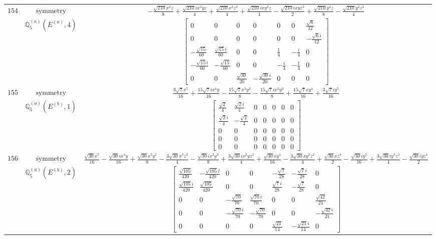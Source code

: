 \documentclass[fleqn,8pt,landscape]{jsarticle}
\begin{document}
\begin{longtable}{ccc}
$ 154 $ & $ \text{symmetry} $ & $ - \frac{\sqrt{210} x^{4} z}{8} + \frac{\sqrt{210} i x^{3} y z}{4} + \frac{\sqrt{210} x^{2} z^{3}}{4} + \frac{\sqrt{210} i x y^{3} z}{4} - \frac{\sqrt{210} i x y z^{3}}{2} + \frac{\sqrt{210} y^{4} z}{8} - \frac{\sqrt{210} y^{2} z^{3}}{4} $ \\
$  $ & $ \mathbb{Q}_{5}^{(a)}(E^{(a)},4) $ & $ \begin{bmatrix} 0 & 0 & 0 & 0 & 0 & 0 & \frac{\sqrt{6}}{12} \\ 0 & 0 & 0 & 0 & 0 & 0 & - \frac{\sqrt{6} i}{12} \\ - \frac{\sqrt{15}}{60} & \frac{\sqrt{15} i}{60} & 0 & 0 & \frac{1}{4} & - \frac{i}{4} & 0 \\ - \frac{\sqrt{15} i}{60} & - \frac{\sqrt{15}}{60} & 0 & 0 & - \frac{i}{4} & - \frac{1}{4} & 0 \\ 0 & 0 & \frac{\sqrt{30}}{20} & - \frac{\sqrt{30} i}{20} & 0 & 0 & 0 \end{bmatrix} $ \\ \hline
$ 155 $ & $ \text{symmetry} $ & $ \frac{3 \sqrt{7} x^{5}}{16} + \frac{15 \sqrt{7} i x^{4} y}{16} - \frac{15 \sqrt{7} x^{3} y^{2}}{8} - \frac{15 \sqrt{7} i x^{2} y^{3}}{8} + \frac{15 \sqrt{7} x y^{4}}{16} + \frac{3 \sqrt{7} i y^{5}}{16} $ \\
$  $ & $ \mathbb{Q}_{5}^{(a)}(E^{(b)},1) $ & $ \begin{bmatrix} \frac{\sqrt{2}}{4} & \frac{\sqrt{2} i}{4} & 0 & 0 & 0 & 0 & 0 \\ \frac{\sqrt{2} i}{4} & - \frac{\sqrt{2}}{4} & 0 & 0 & 0 & 0 & 0 \\ 0 & 0 & 0 & 0 & 0 & 0 & 0 \\ 0 & 0 & 0 & 0 & 0 & 0 & 0 \\ 0 & 0 & 0 & 0 & 0 & 0 & 0 \end{bmatrix} $ \\ \hline
$ 156 $ & $ \text{symmetry} $ & $ \frac{\sqrt{30} x^{5}}{16} - \frac{\sqrt{30} i x^{4} y}{16} + \frac{\sqrt{30} x^{3} y^{2}}{8} - \frac{3 \sqrt{30} x^{3} z^{2}}{4} - \frac{\sqrt{30} i x^{2} y^{3}}{8} + \frac{3 \sqrt{30} i x^{2} y z^{2}}{4} + \frac{\sqrt{30} x y^{4}}{16} - \frac{3 \sqrt{30} x y^{2} z^{2}}{4} + \frac{\sqrt{30} x z^{4}}{2} - \frac{\sqrt{30} i y^{5}}{16} + \frac{3 \sqrt{30} i y^{3} z^{2}}{4} - \frac{\sqrt{30} i y z^{4}}{2} $ \\
$  $ & $ \mathbb{Q}_{5}^{(a)}(E^{(b)},2) $ & $ \begin{bmatrix} \frac{\sqrt{105}}{420} & - \frac{\sqrt{105} i}{420} & 0 & 0 & - \frac{\sqrt{7}}{28} & - \frac{\sqrt{7} i}{28} & 0 \\ \frac{\sqrt{105} i}{420} & \frac{\sqrt{105}}{420} & 0 & 0 & \frac{\sqrt{7} i}{28} & - \frac{\sqrt{7}}{28} & 0 \\ 0 & 0 & - \frac{\sqrt{70}}{70} & \frac{\sqrt{70} i}{70} & 0 & 0 & \frac{\sqrt{42}}{21} \\ 0 & 0 & - \frac{\sqrt{70} i}{70} & - \frac{\sqrt{70}}{70} & 0 & 0 & - \frac{\sqrt{42} i}{21} \\ 0 & 0 & 0 & 0 & \frac{\sqrt{21}}{14} & - \frac{\sqrt{21} i}{14} & 0 \end{bmatrix} $ \\ \hline

\end{longtable}
\end{document}

